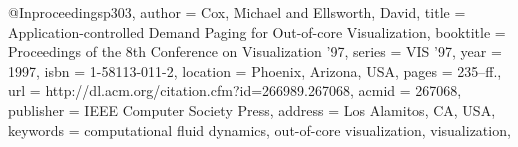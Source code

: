 @Inproceedings{p303,
	author = {Cox, Michael and Ellsworth, David},
	title = {Application-controlled Demand Paging for Out-of-core Visualization},
	booktitle = {Proceedings of the 8th Conference on Visualization '97},
	series = {VIS '97},
	year = {1997},
	isbn = {1-58113-011-2},
	location = {Phoenix, Arizona, USA},
	pages = {235--ff.},
	url = {http://dl.acm.org/citation.cfm?id=266989.267068},
	acmid = {267068},
	publisher = {IEEE Computer Society Press},
	address = {Los Alamitos, CA, USA},
	keywords = {computational fluid dynamics, out-of-core visualization, visualization},
} 